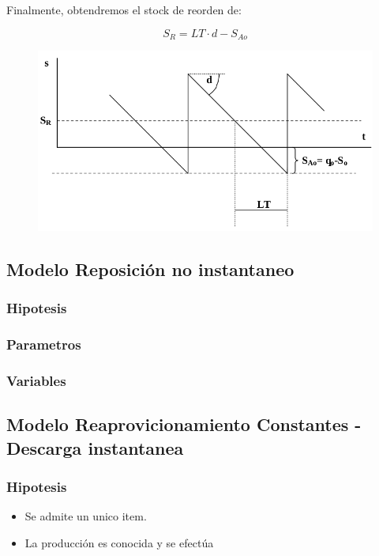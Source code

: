 \documentclass{article}
\begin{document}
Finalmente, obtendremos el stock de reorden de:

\begin{equation}
    S_R = LT \cdot d - S_{Ao}
\end{equation}


\begin{figure}[h!]
    \includegraphics[width=\linewidth]{imagenes/stock-reorden-agotamiento.png}
\end{figure}

\newpage
\subsection{Modelo Reposición no instantaneo}


\subsubsection{Hipotesis}

\subsubsection{Parametros}

\subsubsection{Variables}

\subsection{Modelo Reaprovicionamiento Constantes - Descarga instantanea}

\subsubsection{Hipotesis}
\begin{itemize}
    \item Se admite un unico item.
    \item La producción es conocida y se efectúa
\end{itemize}
\end{document}

